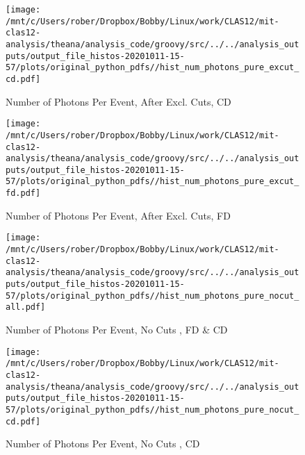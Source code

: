 \documentclass{article}
\begin{document}
\begin{landscape}
    \begin{figure}[h]
        \centering

        \texttt{[image: /mnt/c/Users/rober/Dropbox/Bobby/Linux/work/CLAS12/mit-clas12-analysis/theana/analysis\_code/groovy/src/../../analysis\_outputs/output\_file\_histos-20201011-15-57/plots/original\_python\_pdfs//hist\_num\_photons\_pure\_excut\_cd.pdf]}
        \captionsetup{textformat=empty,labelformat=blank}
        \caption{Number of Photons Per Event, After Excl. Cuts, CD}
    \end{figure}
    \clearpage
    
    \begin{figure}[h]
        \centering

        \texttt{[image: /mnt/c/Users/rober/Dropbox/Bobby/Linux/work/CLAS12/mit-clas12-analysis/theana/analysis\_code/groovy/src/../../analysis\_outputs/output\_file\_histos-20201011-15-57/plots/original\_python\_pdfs//hist\_num\_photons\_pure\_excut\_fd.pdf]}
        \captionsetup{textformat=empty,labelformat=blank}
        \caption{Number of Photons Per Event, After Excl. Cuts, FD}
    \end{figure}
    \clearpage
    
    \begin{figure}[h]
        \centering

        \texttt{[image: /mnt/c/Users/rober/Dropbox/Bobby/Linux/work/CLAS12/mit-clas12-analysis/theana/analysis\_code/groovy/src/../../analysis\_outputs/output\_file\_histos-20201011-15-57/plots/original\_python\_pdfs//hist\_num\_photons\_pure\_nocut\_all.pdf]}
        \captionsetup{textformat=empty,labelformat=blank}
        \caption{Number of Photons Per Event, No Cuts , FD \& CD}
    \end{figure}
    \clearpage
    
    \begin{figure}[h]
        \centering

        \texttt{[image: /mnt/c/Users/rober/Dropbox/Bobby/Linux/work/CLAS12/mit-clas12-analysis/theana/analysis\_code/groovy/src/../../analysis\_outputs/output\_file\_histos-20201011-15-57/plots/original\_python\_pdfs//hist\_num\_photons\_pure\_nocut\_cd.pdf]}
        \captionsetup{textformat=empty,labelformat=blank}
        \caption{Number of Photons Per Event, No Cuts , CD}
    \end{figure}
    \clearpage
    
    \begin{figure}[h]
        \centering


\end{figure}
\end{landscape}
\end{document}
